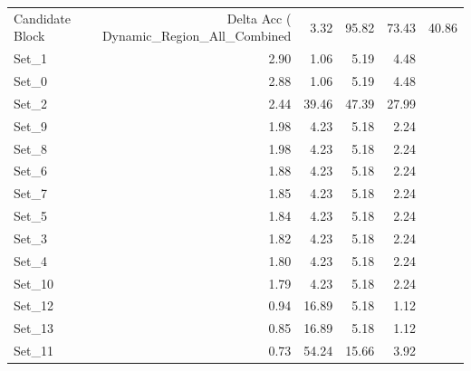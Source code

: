 \begin{tabular}{lrrrr}
\toprule
Candidate Block & Delta Acc (%
\midrule
Dynamic_Region_All_Combined & 3.32 & 95.82 & 73.43 & 40.86 \\
Set_1 & 2.90 & 1.06 & 5.19 & 4.48 \\
Set_0 & 2.88 & 1.06 & 5.19 & 4.48 \\
Set_2 & 2.44 & 39.46 & 47.39 & 27.99 \\
Set_9 & 1.98 & 4.23 & 5.18 & 2.24 \\
Set_8 & 1.98 & 4.23 & 5.18 & 2.24 \\
Set_6 & 1.88 & 4.23 & 5.18 & 2.24 \\
Set_7 & 1.85 & 4.23 & 5.18 & 2.24 \\
Set_5 & 1.84 & 4.23 & 5.18 & 2.24 \\
Set_3 & 1.82 & 4.23 & 5.18 & 2.24 \\
Set_4 & 1.80 & 4.23 & 5.18 & 2.24 \\
Set_10 & 1.79 & 4.23 & 5.18 & 2.24 \\
Set_12 & 0.94 & 16.89 & 5.18 & 1.12 \\
Set_13 & 0.85 & 16.89 & 5.18 & 1.12 \\
Set_11 & 0.73 & 54.24 & 15.66 & 3.92 \\
\bottomrule
\end{tabular}
